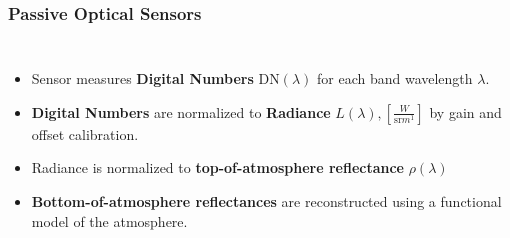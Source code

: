 %
\begin{frame}
\frametitle{Passive Optical Sensors}
\begin{columns}
	
	
	\begin{itemize}[itemsep=.5em]
		\item<1-> Sensor measures \textbf{Digital Numbers} $\text{DN}(\lambda)$ for each band wavelength $\lambda$. 
		\item<2-> \textbf{Digital Numbers} are normalized to \textbf{Radiance} 
		$L(\lambda), \left[\frac{W}{\text{sr}m^1}\right]$ by gain and offset calibration.
		\item<4-> Radiance is normalized to \textbf{top-of-atmosphere reflectance} $\rho(\lambda)$
		\item<4-> \textbf{Bottom-of-atmosphere reflectances} are reconstructed using a functional model of the atmosphere.
	\end{itemize}
	
%	
%	
%	

	
	
	
\end{columns}
\end{frame}
